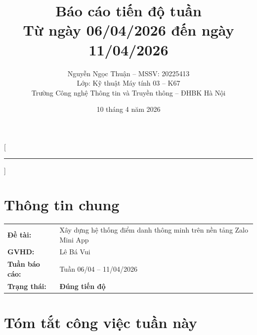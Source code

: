 \documentclass{article}
\title{Báo cáo tiến độ tuần\\[0.3em] \large Từ ngày 06/04/2026 đến ngày 11/04/2026}
\author{Nguyễn Ngọc Thuận -- MSSV: 20225413\\[0.2em] \normalsize Lớp: Kỹ thuật Máy tính 03 -- K67\\[0.1em] \normalsize Trường Công nghệ Thông tin và Truyền thông -- ĐHBK Hà Nội}
\date{10 tháng 4 năm 2026}
\begin{document}
\maketitle



\pagestyle{fancy}
\fancyhf{}
\fancyfoot[C]{\small\thepage}
\renewcommand{\headrulewidth}{0.4pt}

[\vspace{-0.3em}\textcolor{hustred}{\rule{\textwidth}{0.8pt}}]

\section{Thông tin chung}

\begin{tabularx}{\textwidth}{@{}l X@{}}
\textbf{Đề tài:} & Xây dựng hệ thống điểm danh thông minh trên nền tảng Zalo Mini App \\
\textbf{GVHD:} & Lê Bá Vui \\
\textbf{Tuần báo cáo:} & Tuần 06/04 -- 11/04/2026 \\
\textbf{Trạng thái:} & \textcolor{statusgreen}{\textbf{Đúng tiến độ}} \\
\end{tabularx}

\section{Tóm tắt công việc tuần này}
\end{document}
